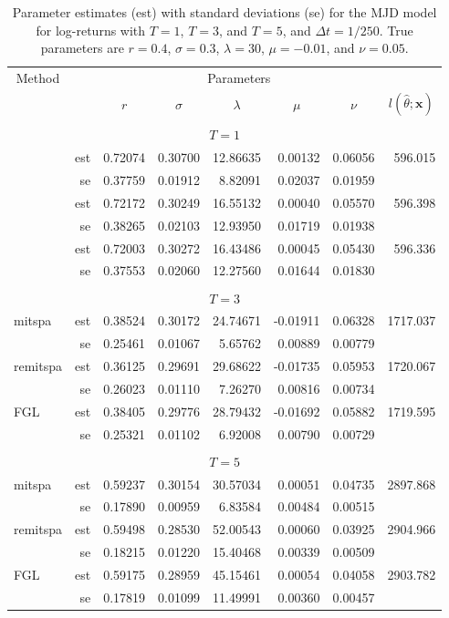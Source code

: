 \begin{table}
	\newcommand{\ra}[1]{\renewcommand{\arraystretch}{#1}}
	\ra{1.3}
	\centering
	\begin{tabular}{@{}lrrrrrrr@{}}
		\toprule
		\multicolumn{1}{c}{Method}& & \multicolumn{5}{c}{Parameters}\\
		\cmidrule{1-1} \cmidrule{3-7}
		& & \multicolumn{1}{c}{$r$} & \multicolumn{1}{c}{$\sigma$} & \multicolumn{1}{c}{$\lambda$} &\multicolumn{1}{c}{$\mu$} &\multicolumn{1}{c}{$\nu$} &\multicolumn{1}{c}{$l(\hat{\theta};\mathbf{x})$} \\
		\midrule
		\\
		\multicolumn{8}{c}{\textbf{$T=1$}}\\
		\text{mitspa} &est& 0.72074&0.30700&12.86635&0.00132&0.06056&596.015\\
		&se&0.37759&0.01912&8.82091&0.02037&0.01959\\
		\text{remitspa}&est&0.72172&0.30249&16.55132&0.00040&0.05570&596.398\\
		&se&0.38265&0.02103&12.93950&0.01719&0.01938\\
		\text{FGL} &est&0.72003&0.30272&16.43486&0.00045&0.05430&596.336\\
		&se&0.37553&0.02060&12.27560&0.01644&0.01830\\
		\\
		\multicolumn{8}{c}{\textbf{$T=3$}}\\
		mitspa & est & 0.38524 & 0.30172 & 24.74671 & -0.01911 &  0.06328 & 1717.037\\
		& se& 0.25461 & 0.01067 & 5.65762 & 0.00889 & 0.00779\\
		remitspa & est & 0.36125 & 0.29691 & 29.68622 & -0.01735 & 0.05953 & 1720.067\\
		& se& 0.26023 & 0.01110 & 7.26270 & 0.00816 & 0.00734 \\
		FGL & est & 0.38405 & 0.29776 & 28.79432 & -0.01692 & 0.05882 & 1719.595\\
		& se &0.25321 & 0.01102 & 6.92008 & 0.00790 & 0.00729\\
		\\
		\multicolumn{8}{c}{\textbf{$T=5$}}\\
		mitspa & est & 0.59237 &  0.30154 & 30.57034 & 0.00051 & 0.04735 & 2897.868\\
		& se&0.17890&0.00959&6.83584&0.00484&0.00515\\
		remitspa & est & 0.59498 & 0.28530 & 52.00543 & 0.00060 & 0.03925 & 2904.966\\
		& se &0.18215&0.01220&15.40468&0.00339&0.00509\\
		FGL & est &0.59175 & 0.28959 & 45.15461 & 0.00054 & 0.04058 & 2903.782\\
		& se &0.17819 & 0.01099 & 11.49991 & 0.00360 & 0.00457\\
		\bottomrule
	\end{tabular}
	\caption[Parameter estimates with standard deviations: Merton jump-diffusion model for log-returns] {Parameter estimates (est) with standard deviations (se) for the MJD model for log-returns with $T=1$, $T=3$, and $T=5$, and $\Delta t=1/250$.
		True parameters are $r=0.4$, $\sigma=0.3$, $\lambda=30$, $\mu=-0.01$, and $\nu=0.05$.}
	\label{tab: mjdsim}
\end{table}


